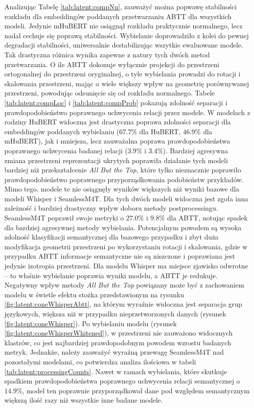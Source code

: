 Analizując Tabelę \ref{tab:latent:compNu}, zauważyć można popwawę stabilności rozkładu dla embeddingów poddanych przetwarzaniu ABTT dla wszystkich modeli. Jedynie mHuBERT nie osiągnął rozkładu praktycznie normalnego, lecz nadal cechuje się poprawą stabilności. Wybielanie doprowadziło z kolei do pewnej degradacji stabilności, uniwersalnie destabilizując wszytkie ewaluowane modele. Tak drastyczna różnica wynika zapewne z natury tych dwóch metod przetwarzania. O ile ABTT dokonuje wyłącznie projekcji do przestrzeni ortogonalnej do przestrzeni oryginalnej, o tyle wybielania prowadzi do rotacji i skalowania przestrzeni, mając o wiele większy wpływ na geometrię porównywanej przestrzeni, powodując odsunięcie się od rozkładu normalnego. Tabele \ref{tab:latent:compLoc} i \ref{tab:latent:compProb} pokazują zdolność separacji i prawdopodobieństwo poprawnego uchwycenia relacji przez modele. W modelach z rodziny HuBERT widoczna jest drastyczna poprawa zdolności separacji dla embeddingów poddanych wybielaniu ($67.7\%$ dla HuBERT, $46.9\%$ dla mHuBERT), jak i mniejsza, lecz zauważalna poprawa prawdopodobieństwa poprawnego uchwycenia badanej relacji ($3.9\%$ i $3.4\%$). Bardziej agresywna zmiana przestrzeni reprezentacji ukrytych poprawiła działanie tych modeli bardziej niż przekształcenie \textit{All But the Top}, które tylko nieznacznie poprawiło prawdopodobieństwo poprawnego przyporządkowania podobieństw przykładów. Mimo tego, modele te nie osiągnęły wyników większych niż wyniki bazowe dla modeli Whisper i SeamlessM4T. Dla tych dwóch modeli widoczna jest zgoła inna zależność i bardziej drastyczny wpływ doboru metody postprocessingu. SeamlessM4T poprawił swoje metryki o $27.0\%$ i $9.8\%$ dla ABTT, notując spadek dla bardziej agresywnej metody wybielania. Potencjalnym powodem są wysoka zdolność klasyfikacji semantycznej dla bazowego przypadku i zbyt duża modyfikacja geometrii przestrzeni po wykorzystaniu rotacji i skalowania, gdzie w przypadku ABTT informacje semantyczne nie są niszczone i poprawiana jest jedynie izotropia przestrzeni. Dla modelu Whisper ma miejsce zjawisko odwrotne -- to właśnie wybielanie poprawia wyniki modelu, a ABTT je redukuje. Negatywny wpływ metody \textit{All But the Top} powiązany może być z zachowaniem modelu w świetle efektu stożka przedstawionym na rysunku \ref{fig:latent:coneWhisperAbtt}, na którym wyraźnie widoczna jest separacja grup językowych, większa niż w przypadku nieprzetworzonych danych (rysunek \ref{fig:latent:coneWhisper}). Po wybielaniu modelu (rysunek \ref{fig:latent:coneWhisperWhitened}), w przestrzeni nie zauważono widocznych klastrów, co jest najbardziej prawdopodobnym powodem wzrostu badanych metryk. Jednakże, należy zauważyć wyraźną przewagę SeamlessM4T nad pozostałymi modelami, co potwierdza analiza ilościowa w tabeli \ref{tab:latent:processingCounts}. Nawet w ramach wybielania, które skutkuje spadkiem prawdopodobieństwa poprawnego uchwycenia relacji semantycznej o $14.9\%$, model ten poprawnie przyporządkował dane pod względem semantycznym większą ilość razy niż wszystkie inne badane modele.


